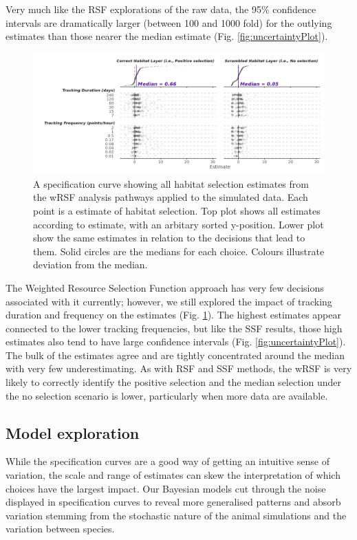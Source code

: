 \documentclass[10pt,a4paper]{article}
\begin{document}
Very much like the RSF explorations of the raw data, the 95\% confidence intervals are dramatically larger (between 100 and 1000 fold) for the outlying estimates than those nearer the median estimate (Fig. \ref{fig:uncertaintyPlot}).

\begin{figure}
\includegraphics[width=1\linewidth]{../figures/wrsfSpecCurve} \caption{A specification curve showing all habitat selection estimates from the wRSF analysis pathways applied to the simulated data. Each point is a estimate of habitat selection. Top plot shows all estimates according to estimate, with an arbitary sorted y-position. Lower plot show the same estimates in relation to the decisions that lead to them. Solid circles are the medians for each choice. Colours illustrate deviation from the median.}\label{fig:specCurveWRSF}
\end{figure}

The Weighted Resource Selection Function approach has very few decisions associated with it currently; however, we still explored the impact of tracking duration and frequency on the estimates (Fig. \ref{fig:specCurveWRSF}).
The highest estimates appear connected to the lower tracking frequencies, but like the SSF results, those high estimates also tend to have large confidence intervals (Fig. \ref{fig:uncertaintyPlot}).
The bulk of the estimates agree and are tightly concentrated around the median with very few underestimating.
As with RSF and SSF methods, the wRSF is very likely to correctly identify the positive selection and the median selection under the no selection scenario is lower, particularly when more data are available.

\subsection{Model exploration}\label{model-exploration}

While the specification curves are a good way of getting an intuitive sense of variation, the scale and range of estimates can skew the interpretation of which choices have the largest impact.
Our Bayesian models cut through the noise displayed in specification curves to reveal more generalised patterns and absorb variation stemming from the stochastic nature of the animal simulations and the variation between species.
\end{document}
